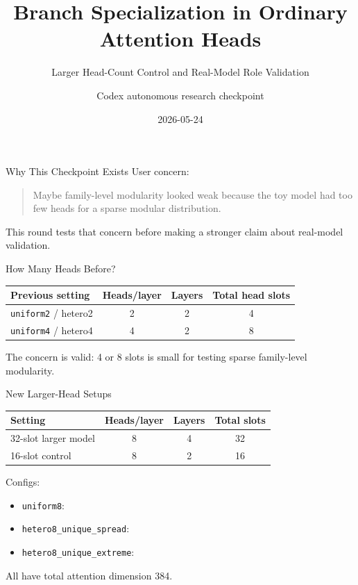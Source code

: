 \documentclass[aspectratio=169]{beamer}
\title[Large-Head Control]{Branch Specialization in Ordinary Attention Heads}
\subtitle{Larger Head-Count Control and Real-Model Role Validation}
\author{Codex autonomous research checkpoint}
\date{2026-05-24}
\newcommand{\dims}[1]{{\texttt{\detokenize{#1}}}}
\begin{document}
\begin{frame}
  \titlepage
\end{frame}

\begin{frame}{Why This Checkpoint Exists}
  \small
  User concern:
  \begin{quote}
    Maybe family-level modularity looked weak because the toy model had too few heads for a sparse modular distribution.
  \end{quote}

  \vspace{0.25cm}
  This round tests that concern before making a stronger claim about real-model validation.
\end{frame}

\begin{frame}{How Many Heads Before?}
  \small
  \begin{tabular}{lccc}
    \toprule
    Previous setting & Heads/layer & Layers & Total head slots \\
    \midrule
    \texttt{uniform2} / hetero2 & 2 & 2 & 4 \\
    \texttt{uniform4} / hetero4 & 4 & 2 & 8 \\
    \bottomrule
  \end{tabular}

  \vspace{0.4cm}
  The concern is valid: 4 or 8 slots is small for testing sparse family-level modularity.
\end{frame}

\begin{frame}{New Larger-Head Setups}
  \scriptsize
  \begin{tabular}{lccc}
    \toprule
    Setting & Heads/layer & Layers & Total slots \\
    \midrule
    32-slot larger model & 8 & 4 & 32 \\
    16-slot control & 8 & 2 & 16 \\
    \bottomrule
  \end{tabular}

  \vspace{0.3cm}
  Configs:
  \begin{itemize}
    \item \texttt{uniform8}: \dims{[48,48,48,48,48,48,48,48]}
    \item \texttt{hetero8\_unique\_spread}: \dims{[16,24,32,40,48,56,72,96]}
    \item \texttt{hetero8\_unique\_extreme}: \dims{[8,16,24,32,40,48,64,152]}
  \end{itemize}
  All have total attention dimension 384.
\end{frame}
\end{document}
